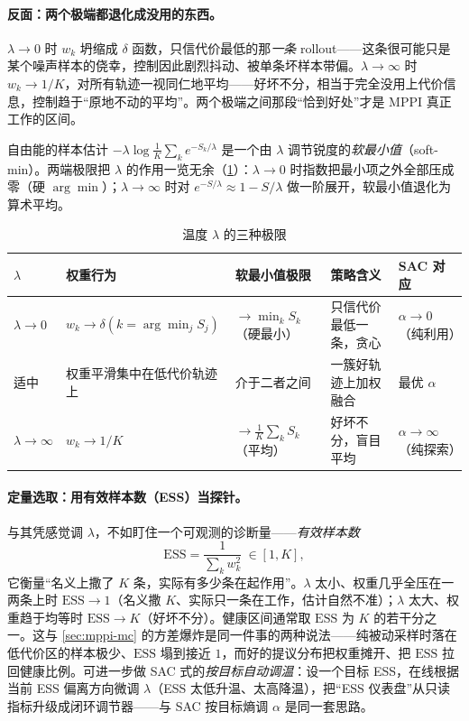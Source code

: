 \paragraph{反面：两个极端都退化成没用的东西。}$\lambda\to0$ 时 $w_k$ 坍缩成 $\delta$ 函数，只信代价最低的那\emph{一条} rollout——这条很可能只是某个噪声样本的侥幸，控制因此剧烈抖动、被单条坏样本带偏。$\lambda\to\infty$ 时 $w_k\to1/K$，对所有轨迹一视同仁地平均——好坏不分，相当于完全没用上代价信息，控制趋于“原地不动的平均”。两个极端之间那段“恰到好处”才是 MPPI 真正工作的区间。

\begin{theorem}\label{thm:mppi-lambda}
自由能的样本估计 $-\lambda\log\frac1K\sum_k e^{-S_k/\lambda}$ 是一个由 $\lambda$ 调节锐度的\emph{软最小值}（soft-min）。两端极限把 $\lambda$ 的作用一览无余（\cref{tab:mppi-lambda}）：$\lambda\to0$ 时指数把最小项之外全部压成零（硬 $\arg\min$）；$\lambda\to\infty$ 时对 $e^{-S/\lambda}\approx1-S/\lambda$ 做一阶展开，软最小值退化为算术平均。
\end{theorem}

\begin{table}[H]\centering\small
\caption{温度 $\lambda$ 的三种极限}
\label{tab:mppi-lambda}
\begin{tabular}{lllll}
\toprule
$\lambda$ & 权重行为 & 软最小值极限 & 策略含义 & SAC 对应 \\
\midrule
$\lambda\to0$ & $w_k\to\delta(k{=}\arg\min_j S_j)$ & $\to\min_k S_k$（硬最小） & 只信代价最低一条，贪心 & $\alpha\to0$（纯利用） \\
适中 & 权重平滑集中在低代价轨迹上 & 介于二者之间 & 一簇好轨迹上加权融合 & 最优 $\alpha$ \\
$\lambda\to\infty$ & $w_k\to1/K$ & $\to\frac1K\sum_k S_k$（平均） & 好坏不分，盲目平均 & $\alpha\to\infty$（纯探索） \\
\bottomrule
\end{tabular}
\end{table}

\paragraph{定量选取：用有效样本数（ESS）当探针。}与其凭感觉调 $\lambda$，不如盯住一个可观测的诊断量——\emph{有效样本数}
\begin{equation}
  \mathrm{ESS}=\frac{1}{\sum_k w_k^2}\ \in[1,K],
  \label{eq:mppi-ess}
\end{equation}
它衡量“名义上撒了 $K$ 条，实际有多少条在起作用”。$\lambda$ 太小、权重几乎全压在一两条上时 $\mathrm{ESS}\to1$（名义撒 $K$、实际只一条在工作，估计自然不准）；$\lambda$ 太大、权重趋于均等时 $\mathrm{ESS}\to K$（好坏不分）。健康区间通常取 $\mathrm{ESS}$ 为 $K$ 的若干分之一。这与 \cref{sec:mppi-mc} 的方差爆炸是同一件事的两种说法——纯被动采样时落在低代价区的样本极少、$\mathrm{ESS}$ 塌到接近 $1$，而好的提议分布把权重摊开、把 $\mathrm{ESS}$ 拉回健康比例。可进一步做 SAC 式的\emph{按目标自动调温}：设一个目标 ESS，在线根据当前 ESS 偏离方向微调 $\lambda$（ESS 太低升温、太高降温），把“ESS 仪表盘”从只读指标升级成闭环调节器——与 SAC 按目标熵调 $\alpha$ 是同一套思路。

